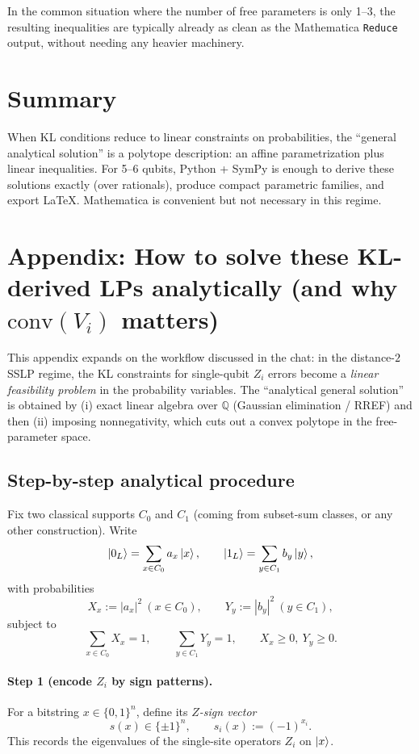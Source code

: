 \documentclass[11pt]{article}
\begin{document}
In the common situation where the number of free parameters is only 1--3, the resulting inequalities are typically already as clean as the Mathematica \texttt{Reduce} output, without needing any heavier machinery.

\section{Summary}

When KL conditions reduce to linear constraints on probabilities, the ``general analytical solution'' is a polytope description: an affine parametrization plus linear inequalities. For 5--6 qubits, Python + SymPy is enough to derive these solutions exactly (over rationals), produce compact parametric families, and export \LaTeX. Mathematica is convenient but not necessary in this regime.



\appendix
\section{Appendix: How to solve these KL-derived LPs analytically (and why $\mathrm{conv}(V_i)$ matters)}
\label{sec:appendix-procedure}

This appendix expands on the workflow discussed in the chat: in the distance-$2$ SSLP regime, the KL constraints for single-qubit $Z_i$ errors become a \emph{linear feasibility problem} in the probability variables. The ``analytical general solution'' is obtained by (i) exact linear algebra over $\mathbb{Q}$ (Gaussian elimination / RREF) and then (ii) imposing nonnegativity, which cuts out a convex polytope in the free-parameter space.

\subsection{Step-by-step analytical procedure}

Fix two classical supports $C_0$ and $C_1$ (coming from subset-sum classes, or any other construction). Write
\[
\ket{0_L}=\sum_{x\in C_0} a_x\ket{x},\qquad
\ket{1_L}=\sum_{y\in C_1} b_y\ket{y},
\]
with probabilities
\[
X_x:=|a_x|^2\ (x\in C_0),\qquad Y_y:=|b_y|^2\ (y\in C_1),
\]
subject to
\[
\sum_{x\in C_0}X_x=1,\qquad \sum_{y\in C_1}Y_y=1,\qquad X_x\ge 0,\ Y_y\ge 0.
\]

\paragraph{Step 1 (encode $Z_i$ by sign patterns).}
For a bitstring $x\in\{0,1\}^n$, define its \emph{$Z$-sign vector}
\[
 s(x)\in\{\pm 1\}^n,\qquad s_i(x):=(-1)^{x_i}.
\]
This records the eigenvalues of the single-site operators $Z_i$ on $\ket{x}$.
\end{document}
